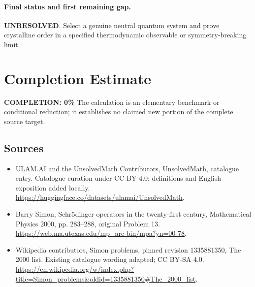 \documentclass[11pt]{article}
\begin{document}
\paragraph{Final status and first remaining gap.}
\textbf{UNRESOLVED}. Select a genuine neutral quantum system and prove crystalline order in a specified thermodynamic observable or symmetry-breaking limit.

\section{Completion Estimate}
\noindent\textbf{COMPLETION: 0\%}
The calculation is an elementary benchmark or conditional reduction; it establishes no claimed new portion of the complete source target.

\subsection{Sources}
\begin{itemize}
\item[\hypertarget{source:statement:1}{S1}] ULAM.AI and the UnsolvedMath Contributors, UnsolvedMath, catalogue entry. Catalogue curation under CC BY 4.0; definitions and English exposition added locally.
\url{https://huggingface.co/datasets/ulamai/UnsolvedMath}.
\item[\hypertarget{source:statement:2}{S2}] Barry Simon, Schrödinger operators in the twenty-first century, Mathematical Physics 2000, pp. 283–288, original Problem 13.
\url{https://web.ma.utexas.edu/mp_arc-bin/mpa?yn=00-78}.
\item[\hypertarget{source:statement:3}{S3}] Wikipedia contributors, Simon problems, pinned revision 1335881350, The 2000 list. Existing catalogue wording adapted; CC BY-SA 4.0.
\url{https://en.wikipedia.org/w/index.php?title=Simon_problems&oldid=1335881350#The_2000_list}.
\end{itemize}
\label{end:statement}
\end{document}

